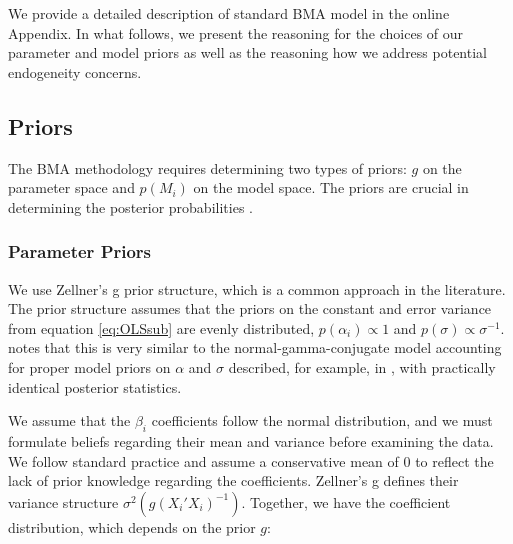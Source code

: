 \documentclass[a4paper,11pt]{article}
\begin{document}
We provide a detailed description of standard BMA model in the online Appendix. In what follows, we present the reasoning for the choices of our parameter and model priors as well as the reasoning how we address potential endogeneity concerns. 

\subsection*{Priors}
\label{sec:priors}
The \ac{BMA} methodology requires determining two types of priors: $g$ on the parameter space and $p(M_{i})$ on the model space. The priors are crucial in determining the posterior probabilities \citep{FeldkircherZeugner2009,CicconeJarocinski2010,Liangetal2008}.

\subsubsection*{Parameter Priors}
We use Zellner's g prior structure, which is a common approach in the literature. The prior structure assumes that the priors on the constant and error variance from equation \ref{eq:OLSsub} are evenly distributed, $p(\alpha_{i}) \propto 1$ and $p(\sigma) \propto \sigma^{-1}$. \citet{Zeugner2011} notes that this is very similar to the normal-gamma-conjugate model accounting for proper model priors on $\alpha$ and $\sigma$ described, for example, in \citet{Koop2003}, with practically identical posterior statistics. 

We assume that the $\beta_{i}$ coefficients follow the normal distribution, and we must formulate beliefs regarding their mean and variance before examining the data. We follow standard practice and assume a conservative mean of 0 to reflect the lack of prior knowledge regarding the coefficients. Zellner's g defines their variance structure $\sigma^{2}(g(X_{i}'X_{i})^{-1})$. Together, we have the coefficient distribution, which depends on the prior $g$:
\end{document}
